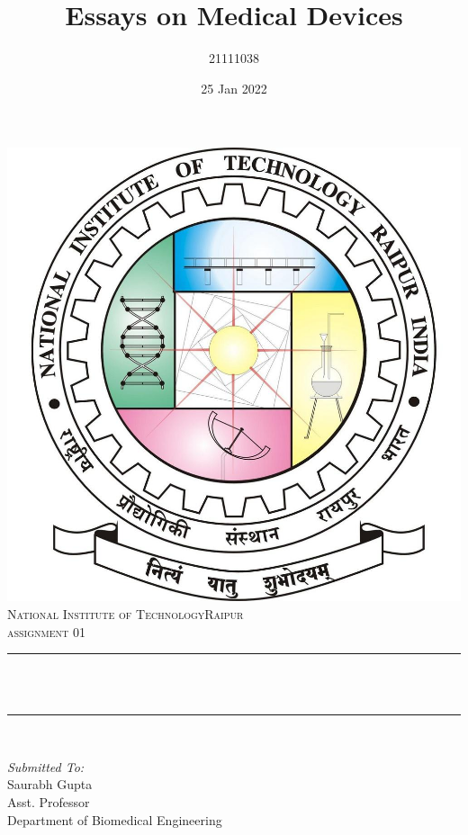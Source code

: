 \documentclass[12pt]{article}
\title{Essays on Medical Devices}								%
\author{21111038}								%
\date{25 Jan 2022}											%
\makeatletter
\let\thetitle\@title
\makeatother
\begin{document}

\begin{titlepage}
	\centering
    \vspace*{0.5 cm}
    \includegraphics[scale = 0.20]{logo.jpg}\\[1.0 cm]	%
    \textsc{\LARGE  National Institute of Technology\newline\newline Raipur}\\[2.0 cm]	%
	\textsc{\Large assignment 01}\\[0.5 cm]				%
	\rule{\linewidth}{0.2 mm} \\[0.4 cm]
	{ \huge \bfseries \thetitle}\\
	\rule{\linewidth}{0.2 mm} \\[1.5 cm]
	
	\begin{minipage}{0.4\textwidth}
		\begin{flushleft} \large
			\emph{Submitted To:}\\
			Saurabh Gupta\\
            Asst. Professor\\
            Department of Biomedical Engineering\\
			\end{flushleft}
			\end{minipage}~
			\begin{minipage}{0.4\textwidth}
            

\end{minipage}
\end{titlepage}
\end{document}

